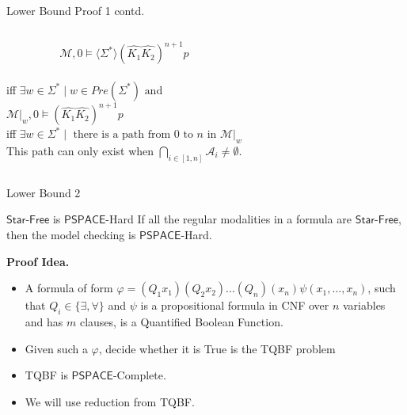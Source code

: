 \documentclass{beamer}
\newcommand\ldiaarg[1]{\langle#1\rangle}
\newcommand{\M}{\mathcal{M}}
\newcommand{\starfree}{\mathsf{Star\mbox{-}Free}}
\newcommand{\PSPACE}{\mathsf{PSPACE}}
\newcommand{\automaton}{\mathcal A}
\begin{document}
\begin{frame}{Lower Bound Proof 1 contd.}
    \begin{columns}
    
    $$\M,0\vDash \ldiaarg{\Sigma^*}(\hat{K_1}\hat{K_2})^{n+1}p$$\\\pause
    iff $\exists w\in\Sigma^*\mid w\in Pre(\Sigma^*)\mbox{ and }$\\\pause
    $\M|_w,0\vDash(\hat{K_1}\hat{K_2})^{n+1}p$\\\pause
    iff $\exists w\in\Sigma^*\mid\mbox{ there is a path from $0$ to $n$ in }\M|_w$\\\pause
    This path can only exist when $\bigcap_{i\in[1,n]}\automaton_i\neq\emptyset$.
    \end{columns}
    
    
\end{frame}

\begin{frame}{Lower Bound 2}
    \begin{block}{$\starfree$ is $\PSPACE$-Hard}
    If all the regular modalities in a formula are $\starfree$, then the model checking is $\PSPACE$-Hard.
    \end{block}\pause
    \textbf{Proof Idea. }\\
    \begin{itemize}
        \item<1-> A formula of form $\varphi = (Q_1 x_1) (Q_2 x_2)...(Q_n)(x_n)\psi(x_1,\ldots,x_n)$, such that $Q_i\in\{\exists, \forall\}$ and $\psi$ is a propositional formula in CNF over $n$ variables and has $m$ clauses, is a Quantified Boolean Function.
        
        \item<2-> Given such a $\varphi$, decide whether it is True is the TQBF problem
        
        \item<3-> TQBF is $\PSPACE$-Complete.
        
        \item<4-> We will use reduction from TQBF.
    \end{itemize}
\end{frame}
\end{document}
